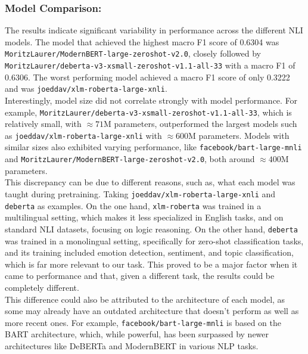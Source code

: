 \documentclass[runningheads]{llncs}
\begin{document}
\subsubsection{Model Comparison:} The results indicate significant variability in performance across the different NLI models. The model that achieved the highest macro F1 score of 0.6304 was \texttt{MoritzLaurer/ModernBERT-large-zeroshot-v2.0}, closely followed by \texttt{MoritzLaurer/deberta-v3-xsmall-zeroshot-v1.1-all-33} with a macro F1 of 0.6306. The worst performing model achieved a macro F1 score of only 0.3222 and was \texttt{joeddav/xlm-roberta-large-xnli}.
\noindent
\\
Interestingly, model size did not correlate strongly with model performance. For example, \texttt{MoritzLaurer/deberta-v3-xsmall-zeroshot-v1.1-all-33}, which is relatively small, with $\approx 71$M parameters, outperformed the largest models such as \texttt{joeddav/xlm-roberta-large-xnli} with $\approx 600$M parameters. Models with similar sizes also exhibited varying performance, like \texttt{facebook/bart-large-mnli} and \texttt{MoritzLaurer/ModernBERT-large-zeroshot-v2.0}, both around $\approx 400$M parameters.
\noindent
\\
This discrepancy can be due to different reasons, such as, what each model was taught during pretraining. Taking \texttt{joeddav/xlm-roberta-large-xnli} and \texttt{deberta} as examples. On the one hand, \texttt{xlm-roberta} was trained in a multilingual setting, which makes it less specialized in English tasks, and on standard NLI datasets, focusing on logic reasoning. On the other hand, \texttt{deberta} was trained in a monolingual setting, specifically for zero-shot classification tasks, and its training included emotion detection, sentiment, and topic classification, which is far more relevant to our task. This proved to be a major factor when it came to performance and that, given a different task, the results could be completely different.
\noindent
\\
This difference could also be attributed to the architecture of each model, as some may already have an outdated architecture that doesn't perform as well as more recent ones. For example, \texttt{facebook/bart-large-mnli} is based on the BART architecture, which, while powerful, has been surpassed by newer architectures like DeBERTa and ModernBERT in various NLP tasks.
\end{document}
